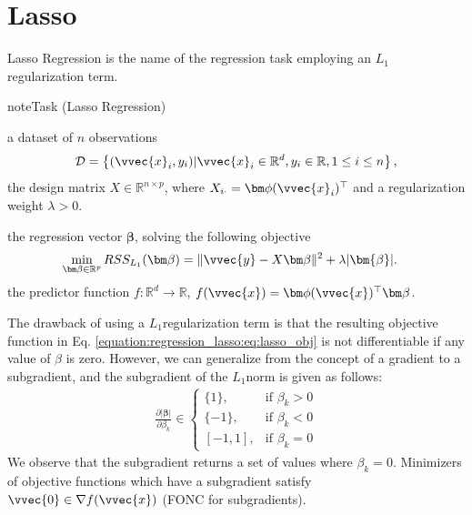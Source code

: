 \documentclass[letterpaper,10pt,english]{jupyterBook}
\begin{document}
\sphinxstepscope


\section{Lasso}
\label{\detokenize{regression_lasso:lasso}}\label{\detokenize{regression_lasso::doc}}
\sphinxAtStartPar
Lasso Regression is the name of the regression task employing an \(L_1\)\sphinxhyphen{}regularization term.

\begin{sphinxadmonition}{note}{Task (Lasso Regression)}

\sphinxAtStartPar
{} a dataset of \(n\) observations
\begin{equation*}\mathcal{D}=\left\{(\vvec{x}_i,y_i)\vert \vvec{x}_i\in\mathbb{R}^{d}, y_i\in\mathbb{R}, 1\leq i \leq n\right\},\end{equation*}
\sphinxAtStartPar
the design matrix \(X\in\mathbb{R}^{n\times p}\), where \(X_{i\cdot}=\bm\phi(\vvec{x}_i)^\top\) and a regularization weight \(\lambda>0\).

\sphinxAtStartPar
{} the regression vector \(\bm\beta\), solving the following objective
\begin{equation}\label{equation:regression_lasso:eq:lasso_obj}
\begin{split}\begin{align}
    \min_{\bm\beta\in\mathbb{R}^p} RSS_{L_1}(\bm\beta) &= \lVert \vvec{y}-X\bm\beta\rVert^2 +\lambda \lvert\bm{\beta}\rvert.
\end{align}\end{split}
\end{equation}
\sphinxAtStartPar
{} the predictor function \(f:\mathbb{R}^d\rightarrow\mathbb{R}\), \(f(\vvec{x})=\bm\phi(\vvec{x})^\top\bm\beta\).
\end{sphinxadmonition}

\sphinxAtStartPar
The drawback of using a \(L_1\)\sphinxhyphen{}regularization term is that the resulting objective function in Eq. \eqref{equation:regression_lasso:eq:lasso_obj} is not differentiable if any value of \(\beta\) is zero. However, we can generalize from the concept of a gradient to a subgradient, and the subgradient of the \(L_1\)\sphinxhyphen{}norm is given as follows:
\label{equation:regression_lasso:0ed67315-38be-4933-a06c-67dad37e4bfb}\begin{align}
    \frac{\partial\lvert\bm\beta\rvert}{\partial \beta_k} \in 
    \begin{cases}
        \{1\},& \text{if } \beta_k>0\\
        \{-1\},& \text{if } \beta_k<0\\
        [-1,1],& \text{if } \beta_k = 0
    \end{cases}
\end{align}
\sphinxAtStartPar
We observe that the subgradient returns a set of values where \(\beta_k=0\).
Minimizers of objective functions which have a subgradient satisfy \(\vvec{0}\in\nabla f(\vvec{x})\) (FONC for subgradients).
\end{document}
